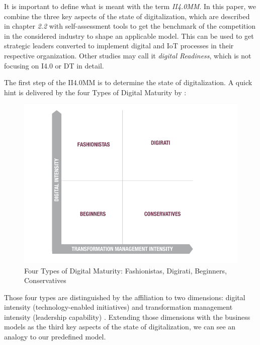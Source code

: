 It is important to define what is meant with the term \emph{\ac{II4.0MM}}. In this paper, we combine the three key aspects of the state of digitalization, which are described in chapter \emph{2.2} %
with self-assessment tools to get the benchmark of the competition in the considered industry to shape an applicable model. This can be used to get strategic leaders converted to implement digital and \ac{IoT} processes in their respective organization.
Other studies may call it \emph{digital Readiness}, which is not focusing on \ac{I4.0} or \ac{DT} in detail.

The first step of the \ac{II4.0MM} is to determine the state of digitalization. A quick hint is delivered by the four Types of Digital Maturity by \cite[p.4]{CapgeminiMaturityModelDigitalAdvantage}:

\begin{figure}[H]
\centering
\includegraphics[width=1\columnwidth]{images/maturityModel_4segments_capgemini.PNG}
\caption{Four Types of Digital Maturity: Fashionistas, Digirati, Beginners, Conservatives \cite{CapgeminiMaturityModelDigitalAdvantage}}
\end{figure}

Those four types are distinguished by the affiliation to two dimensions: digital intensity (technology-enabled initiatives) and transformation management intensity (leadership capability) \cite{CapgeminiMaturityModelDigitalAdvantage}. Extending those dimensions with the business models as the third key aspects of the state of digitalization, we can see an analogy to our predefined model.

